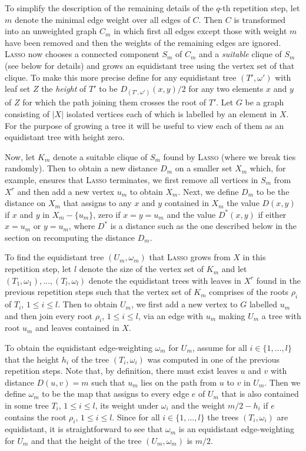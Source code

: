 To simplify the description of the remaining details of the $q$-th repetition
step, let $m$ denote the minimal edge weight over all edges of $C$. Then $C$
is transformed into an unweighted graph $C_m$ in which first all edges except
those with weight $m$ have been removed and then the weights of the remaining
edges are ignored. \textsc{Lasso} now chooses a connected component $S_m$ of
$C_m$ and a {\em suitable} clique of $S_m$ (see below for details) and grows
an equidistant tree using the vertex set of that clique. To make this more
precise define for any equidistant tree $(T',\omega')$ with leaf set $Z$ the
{\em height} of $T'$ to be $D_{(T',\omega')}(x,y)/2$ for any two elements $x$
and $y$ of $Z$ for which the path joining them crosses the root of $T'$.  Let
$G$ be a graph consisting of $|X|$ isolated vertices each of which is labelled
by an element in $X$. For the purpose of growing a tree it will be useful to
view each of them as an equidistant tree with height zero.

Now, let $K_m$ denote a suitable clique of $S_m$ found by \textsc{Lasso} (where
we break ties randomly).  Then to obtain a new distance $D_m$ on a smaller set
$X_m$ which, for example, ensures that \textsc{Lasso} terminates, we first remove
all vertices in $S_m$ from $X^r$ and then add a new vertex $u_m$ to obtain
$X_m$. Next, we define $D_m$ to be the distance on $X_m$ that assigns to any
$x$ and $y$ contained in $X_m$ the value $D(x,y)$ if $x$ and $y$ in
$X_m-\{u_m\}$, zero if $x=y=u_m$ and the value $D^*(x,y)$ if either $x=u_m$ or
$y=u_m$, where $D^*$ is a distance such as the one described below in the
section on recomputing the distance $D_m$.

To find the equidistant tree $(U_m,\omega_m) $ that \textsc{Lasso} grows from $X$
in this repetition step, let $l$ denote the size of the vertex set of $K_m$
and let $(T_1,\omega_1),\ldots, (T_l,\omega_l)$ denote the equidistant trees
with leaves in $X^r$ found in the previous repetition steps such that the
vertex set of $K_m$ comprises of the roots $\rho_i$ of $T_i$, $1\leq i\leq
l$. Then to obtain $U_m$, we first add a new vertex to $G$ labelled $u_m$ and
then join every root $\rho_i$, $1\leq i\leq l$, via an edge with $u_m$ making
$U_m$ a tree with root $u_m$ and leaves contained in $X$.

To obtain the equidistant edge-weighting $\omega_m$ for $U_m$, assume for all
$i\in \{1,\ldots,l\}$ that the height $h_i$ of the tree $(T_i,\omega_i)$ was
computed in one of the previous repetition steps. Note that, by definition,
there must exist leaves $u$ and $v$ with distance $D(u,v)=m$ such that $u_m$
lies on the path from $u$ to $v$ in $U_m$. Then we define $\omega_m$ to be the
map that assigns to every edge $e$ of $U_m$ that is also contained in some
tree $T_i$, $1\leq i\leq l$, its weight under $\omega_i$ and the weight
$m/2-h_i$ if $e$ contains the root $\rho_i$, $1\leq i\leq l$. Since for all
$i\in \{1,\ldots,l\}$ the trees $(T_i,\omega_i)$ are equidistant, it is
straightforward to see that $\omega_m$ is an equidistant edge-weighting for
$U_m$ and that the height of the tree $(U_m,\omega_m) $ is $m/2$.

